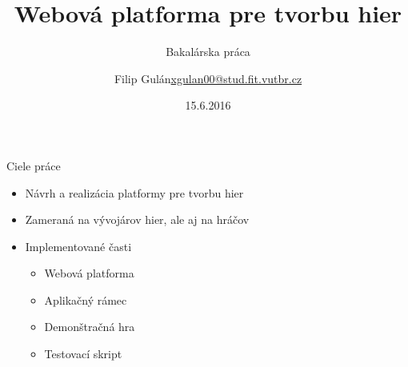 \documentclass[10pt]{beamer}
\title{Webová platforma pre tvorbu hier}
\subtitle{Bakalárska práca}
\date{15.6.2016}
\author{\texorpdfstring{Filip Gulán\newline\url{xgulan00@stud.fit.vutbr.cz}}{Author}}
\begin{document}
\maketitle

\begin{frame}[fragile]{Ciele práce}
    \begin{itemize}
        \item Návrh a realizácia platformy pre tvorbu hier
        \item Zameraná na vývojárov hier, ale aj na hráčov
        \item Implementované časti
            \begin{itemize}
            \item Webová platforma
            \item Aplikačný rámec
            \item Demonštračná hra
            \item Testovací skript
            \end{itemize}
            
    \end{itemize}
\end{frame}
\end{document}
